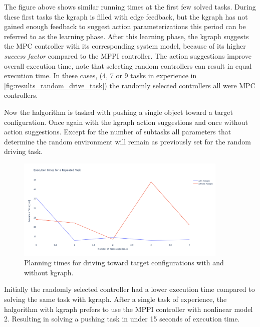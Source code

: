 The figure above shows similar running times at the first few solved tasks. During these first tasks the \ac{kgraph} is filled with edge feedback, but the \ac{kgraph} has not gained enough feedback to suggest action parameterizations this period can be referred to as the learning phase. After this learning phase, the \ac{kgraph} suggests the \ac{MPC} controller with its corresponding system model, because of its higher \textit{success factor} compared to the \ac{MPPI} controller. The action suggestions improve overall execution time, note that selecting random controllers can result in equal execution time. In these cases, (4, 7 or 9 tasks in experience in \cref{fig:results_random_drive_task}) the randomly selected controllers all were \ac{MPC} controllers.\bs

Now the \ac{halgorithm} is tasked with pushing a single object toward a target configuration. Once again with the \ac{kgraph} action suggestions and once without action suggestions. Except for the number of subtasks all parameters that determine the random environment will remain as previously set for the random driving task.\bs

\begin{figure}[H]
    \centering
    \includegraphics[width=0.9\textwidth]{figures/results/random_push_execution_times}
    \caption{Planning times for driving toward target configurations with and without \ac{kgraph}.}%
    \label{fig:random_push_with_without_kgraph}
\end{figure}

Initially the randomly selected controller had a lower execution time compared to solving the same task with \ac{kgraph}. After a single task of experience, the \ac{halgorithm} with \ac{kgraph} prefers to use the \ac{MPPI} controller with nonlinear model 2. Resulting in solving a pushing task in under 15 seconds of execution time. 

